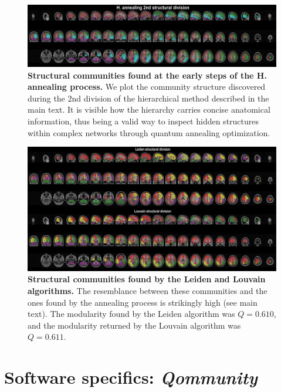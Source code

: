 \documentclass[pdflatex,sn-mathphys-num]{sn-jnl}%
\begin{document}
\begin{figure}[h]
    \centering
    \includegraphics[width=1\linewidth]{Figures/FigS7.pdf}
    \caption{\textbf{Structural communities found at the early steps of the H. annealing process.} We plot the community structure discovered during the 2nd division of the hierarchical method described in the main text. It is visible how the hierarchy carries concise anatomical information, thus being a valid way to inspect hidden structures within complex networks through quantum annealing optimization.}
    \label{fig:hannealing_early_division}
\end{figure}

\begin{figure}[h]
    \centering
    \includegraphics[width=1\linewidth]{Figures/FigS8.pdf}
    \caption{\textbf{Structural communities found by the Leiden and Louvain algorithms.} The resemblance between these communities and the ones found by the annealing process is strikingly high (see main text). The modularity found by the Leiden algorithm was $Q=0.610$, and the modularity returned by the Louvain algorithm was $Q=0.611$.}
    \label{fig:louva_leiden_structural}
\end{figure}

\clearpage
\section*{Software specifics: \textit{Qommunity}}
\end{document}
